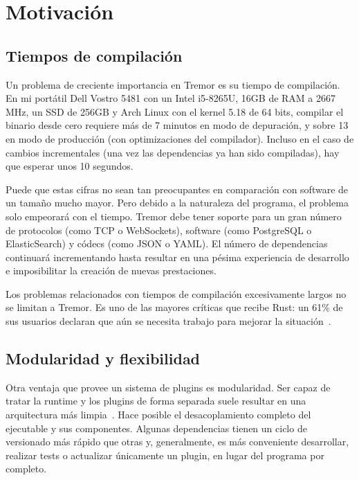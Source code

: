 \section{Motivación}

\subsection{Tiempos de compilación}

Un problema de creciente importancia en Tremor es su tiempo de compilación. En
mi portátil Dell Vostro 5481 con un Intel i5-8265U, 16GB de RAM a 2667 MHz, un
SSD de 256GB y Arch Linux con el kernel 5.18 de 64 bits, compilar el binario
 desde cero requiere más de 7 minutos en modo de depuración, y
sobre 13 en modo de producción (con optimizaciones del compilador). Incluso en
el caso de cambios incrementales (una vez las dependencias ya han sido
compiladas), hay que esperar unos 10 segundos.

Puede que estas cifras no sean tan preocupantes en comparación con software de
un tamaño mucho mayor. Pero debido a la naturaleza del programa, el problema
solo empeorará con el tiempo. Tremor debe tener soporte para un gran número de
protocolos (como TCP o WebSockets), software (como PostgreSQL o ElasticSearch) y
códecs (como JSON o YAML). El número de dependencias continuará incrementando
hasta resultar en una pésima experiencia de desarrollo e imposibilitar la
creación de nuevas prestaciones.

Los problemas relacionados con tiempos de compilación excesivamente largos no se
limitan a Tremor. Es uno de las mayores críticas que recibe Rust: un 61\% de sus
usuarios declaran que aún se necesita trabajo para mejorar la
situación~\cite{rustsurvey}.

\subsection{Modularidad y flexibilidad}

Otra ventaja que provee un sistema de plugins es modularidad. Ser capaz de
tratar la runtime y los plugins de forma separada suele resultar en una
arquitectura más limpia~\cite{baldwin2000design}. Hace posible el
desacoplamiento completo del ejecutable y sus componentes. Algunas dependencias
tienen un ciclo de versionado más rápido que otras y, generalmente, es más
conveniente desarrollar, realizar tests o actualizar únicamente un plugin, en
lugar del programa por completo.

